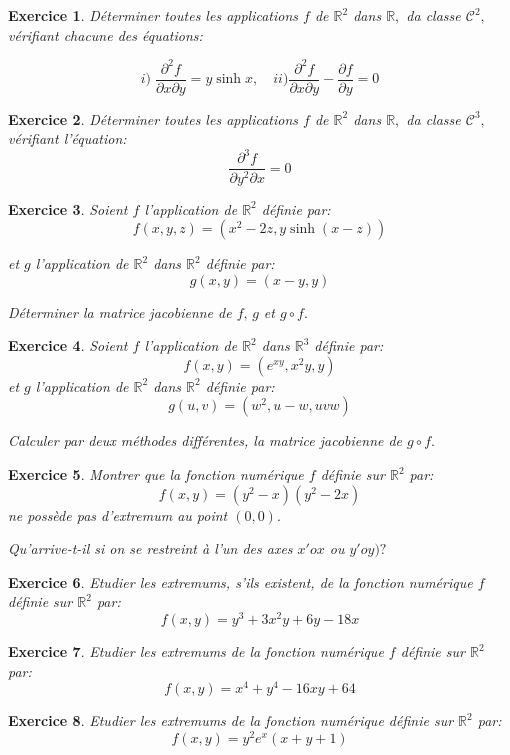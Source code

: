 \documentclass[11pt,a4paper]{report}
\newtheorem{exo}{Exercice}[section]
\begin{document}
\begin{exo}
Déterminer toutes les applications $f$ de $\mathbb{R}^2$ dans $\mathbb{R},$ da classe $\mathcal{C}^2,$ vérifiant chacune des équations:

$$i)\;\frac{\partial^2 f}{\partial x\partial y}=y\sinh x,\quad ii)\frac{\partial^2 f}{\partial x\partial y}-\frac{\partial f}{\partial y}=0 $$
\end{exo}
\begin{exo}
Déterminer toutes les applications $f$ de $\mathbb{R}^2$ dans $\mathbb{R},$ da classe $\mathcal{C}^3,$ vérifiant l'équation:
$$\frac{\partial^3 f}{\partial y^2\partial x}=0$$
\end{exo}
\begin{exo}

Soient $f$ l'application de $\mathbb{R}^2$ définie par:
$$f(x,y,z)=(x^2-2z,y\sinh(x-z))$$

et $g$ l'application de $\mathbb{R}^2$ dans $\mathbb{R}^2$ définie par:
$$g(x,y)=(x-y,y)$$

Déterminer la matrice jacobienne de $f,\,g$ et $g\circ f.$

\end{exo}
\begin{exo}
Soient $f$ l'application de $\mathbb{R}^2$ dans $\mathbb{R}^3$ définie par:
$$f(x,y)=(e^{xy},x^2 y,y)$$
et $g$ l'application de $\mathbb{R}^2$ dans $\mathbb{R}^2$ définie par:
$$g(u,v)=(w^2,u-w,uvw)$$

Calculer par deux méthodes différentes, la matrice jacobienne de $g\circ f.$
\end{exo}
\begin{exo}
Montrer que la fonction numérique $f$ définie sur $\mathbb{R}^2$ par:
$$f(x,y)=(y^2-x)(y^2-2x)$$
ne possède pas d'extremum au point $(0,0).$

Qu'arrive-t-il si on se restreint à l'un des axes $x'ox$ ou $y'oy)?$
\end{exo}
\begin{exo}
Etudier les extremums, s'ils existent, de la fonction numérique $f$ définie sur $\mathbb{R}^2$ par:
$$f(x,y)=y^3+3x^2y+6y-18x$$
\end{exo}
\begin{exo}
Etudier les extremums de la fonction numérique $f$ définie sur $\mathbb{R}^2$ par:
$$f(x,y)=x^4+y^4-16xy+64$$
\end{exo}
\begin{exo}
Etudier les extremums de la fonction numérique définie sur $\mathbb{R}^2$ par:
$$f(x,y)=y^2 e^x (x+y+1)$$
\end{exo}
\end{document}
